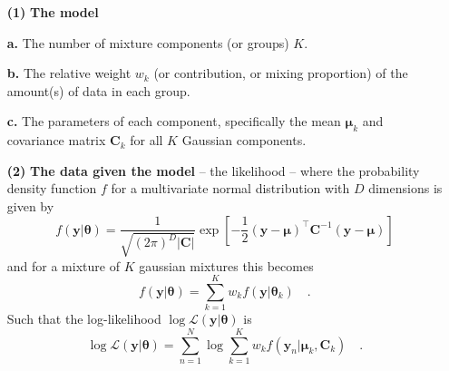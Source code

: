 \documentclass{elsarticle}
\newcommand{\vect}[1]{\boldsymbol{\mathbf{#1}}}
\renewcommand{\vec}[1]{\vect{#1}}
\def\cov{C}
\def\veccov{\vect{\cov}}
\def\vecmean{\vect{\mu}}
\def\weight{w}
\def\datum{y}
\def\data{\vect{\datum}}
\def\likelihood{\mathcal{L}}
\begin{document}
\begin{itemize}
    \item[\textbf{(1)}] \textbf{The model}
    \item[\textbf{a.}]  The number of mixture components (or groups) $K$.
    \item[\textbf{b.}]  The relative weight $w_k$ (or contribution, or mixing 
                        proportion) of the amount(s) of data in each group. 


    \item[\textbf{c.}]  The parameters of each component, specifically the mean
                        $\vecmean_k$ and covariance matrix $\veccov_k$ for all 
                        $K$ Gaussian components.

    \item[\textbf{(2)}] \textbf{The data given the model} -- the likelihood --
                        where the probability density function $f$ for a
                        multivariate normal distribution with $D$ dimensions
                        is given by
                        \begin{equation}
                            f(\vec{\data}|\vec{\theta}) = \frac{1}{\sqrt{(2\pi)^{D}|\veccov|}}\exp{\left[-\frac{1}{2}(\vec{\data} - \vecmean)^\intercal\veccov^{-1}(\vec{\data}-\vecmean)\right]}
                        \end{equation}
                        \noindent{}and for a mixture of $K$ gaussian mixtures
                        this becomes
                        \begin{equation}
                            f(\vec{\data}|\vec{\theta}) = \sum_{k=1}^{K}\weight_{k}f(\vec{\data}|\vec{\theta}_{k}) \quad .
                        \end{equation}
                        \noindent{}Such that the log-likelihood $\log\likelihood(\vec{\data}|\vec{\theta})$ is
                        \begin{equation}
                            \log\likelihood(\vec{\data}|\vec{\theta}) = \sum_{n=1}^{N}\log\sum_{k=1}^{K}\weight_{k}f(\vec{\data}_{n}|\vecmean_{k},\veccov_{k}) \quad .
                        \end{equation}



\end{itemize}
\end{document}
